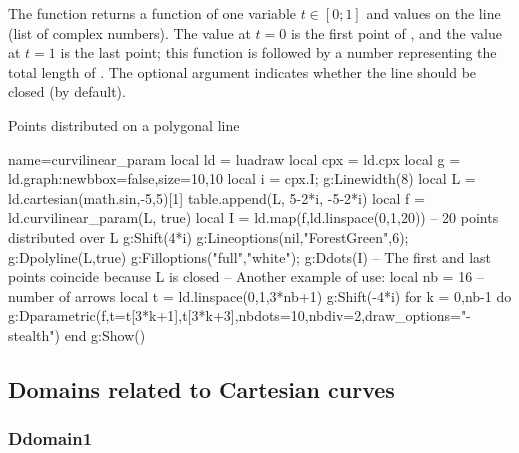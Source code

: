 The function  returns a function of one variable $t\in[0;1]$ and values ​​on the line  (list of complex numbers). The value at $t=0$ is the first point of , and the value at $t=1$ is the last point; this function is followed by a number representing the total length of . The optional argument  indicates whether the line  should be closed (\false by default).

\begin{demo}{Points distributed on a polygonal line}
\begin{luadraw}{name=curvilinear_param}
local ld = luadraw
local cpx = ld.cpx
local g = ld.graph:new{bbox=false,size={10,10}}
local i = cpx.I; g:Linewidth(8)
local L = ld.cartesian(math.sin,-5,5)[1]
table.append(L, {5-2*i, -5-2*i})
local f = ld.curvilinear_param(L, true)
local I = ld.map(f,ld.linspace(0,1,20)) -- 20 points distributed over L
g:Shift(4*i)
g:Lineoptions(nil,"ForestGreen",6); g:Dpolyline(L,true)
g:Filloptions("full","white"); g:Ddots(I) -- The first and last points coincide because L is closed
-- Another example of use:
local nb = 16 -- number of arrows
local t = ld.linspace(0,1,3*nb+1)
g:Shift(-4*i)
for k = 0,nb-1 do
g:Dparametric(f,{t={t[3*k+1],t[3*k+3]},nbdots=10,nbdiv=2,draw_options="-stealth"})
end
g:Show()
\end{luadraw}
\end{demo}


\subsection{Domains related to Cartesian curves}

\subsubsection{Ddomain1}

